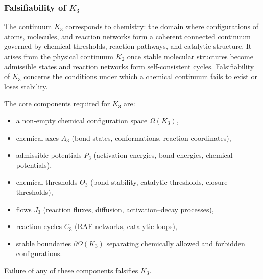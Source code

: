 
\subsubsection{Falsifiability of \texorpdfstring{$K_3$}{K_3}}
\label{sec:falsifiability-k3}

The continuum $K_3$ corresponds to chemistry: the domain where
configurations of atoms, molecules, and reaction networks form a
coherent connected continuum governed by chemical thresholds,
reaction pathways, and catalytic structure.
It arises from the physical continuum $K_2$ once stable molecular
structures become admissible states and reaction networks form
self-consistent cycles.
Falsifiability of $K_3$ concerns the conditions under which a chemical
continuum fails to exist or loses stability.

The core components required for $K_3$ are:
\begin{itemize}
    \item a non-empty chemical configuration space $\Omega(K_3)$,
    \item chemical axes $A_3$ (bond states, conformations, reaction
    coordinates),
    \item admissible potentials $P_3$ (activation energies,
    bond energies, chemical potentials),
    \item chemical thresholds $\Theta_3$ (bond stability,
    catalytic thresholds, closure thresholds),
    \item flows $J_3$ (reaction fluxes, diffusion, activation–decay
    processes),
    \item reaction cycles $C_3$ (RAF networks, catalytic loops),
    \item stable boundaries $\partial\Omega(K_3)$ separating chemically
    allowed and forbidden configurations.
\end{itemize}

Failure of any of these components falsifies $K_3$.




